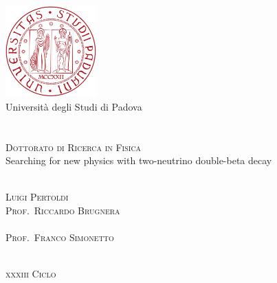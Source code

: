
\begin{titlepage}
  \thispagestyle{empty}
  \begin{center}
  \includegraphics[width=3.5cm]{img/unipd-logo.pdf} \\
  \vspace{0.5cm}
  {\Large Universit\`a degli Studi di Padova} \\
  \hrulefill \\
   \\
  \vspace{2cm}
  \textsc{\large Dottorato di Ricerca in Fisica} \\
  \vspace{3cm}
  \Huge{%
    Searching for new physics with two-neutrino double-beta decay
  }
  \end{center}
  \vspace{3cm}
  \begin{multicols}{2}
  \large
  \noindent
   \\
  \textsc{Luigi Pertoldi}
  \columnbreak
  \flushright
   \\
  \textsc{Prof.~Riccardo Brugnera} \\
  \vspace{12mm}
   \\
  \textsc{Prof.~Franco Simonetto}
  \end{multicols}
  \vspace*{\fill}
  \begin{center}
  \hrulefill \\
  \textsc{\textsc{xxxiii} Ciclo}
  \end{center}
\end{titlepage}
\restoregeometry
